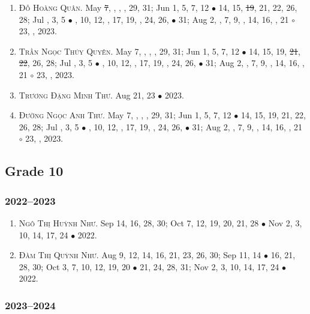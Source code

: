 \documentclass{article}
\begin{document}
\begin{enumerate}
	\item \textsc{Đỗ Hoàng Quân.} May \st{7}, , , , 29, 31; Jun 1, 5, 7, 12 $\bullet$ 14, 15, \st{19}, 21, 22, 26, 28; Jul , 3, 5 $\bullet$ , 10, 12, , 17, 19, , 24, 26,  $\bullet$ 31; Aug 2, , 7, 9, , 14, 16, , 21 $\circ$ 23, , 2023.
	\item \textsc{Trần Ngọc Thúy Quyên.} May 7, , , , 29, 31; Jun 1, 5, 7, 12 $\bullet$ 14, 15, 19, \st{21}, \st{22}, 26, 28; Jul , 3, 5 $\bullet$ , 10, 12, , 17, 19, , 24, 26,  $\bullet$ 31; Aug 2, , 7, 9, , 14, 16, , 21 $\circ$ 23, , 2023.
	\item \textsc{Trương Đặng Minh Thư.} Aug 21, 23 $\bullet$ 2023.
	\item \textsc{Đường Ngọc Anh Thư.} May 7, , , , 29, 31; Jun 1, 5, 7, 12 $\bullet$ 14, 15, 19, 21, 22, 26, 28; Jul , 3, 5 $\bullet$ , 10, 12, , 17, 19, , 24, 26,  $\bullet$ 31; Aug 2, , 7, 9, , 14, 16, , 21 $\circ$ 23, , 2023.
\end{enumerate}


\subsection{Grade 10}

\subsubsection{2022--2023}

\begin{enumerate}
	\item \textsc{Ngô Thị Huỳnh Như.} {\sf[In]} Sep 14, 16, 28, 30; Oct 7, 12, 19, 20, 21, 28 $\bullet$ Nov 2, 3, 10, 14, 17, 24 $\bullet$ 2022. {\sf[Out]}
	\item \textsc{Đàm Thị Quỳnh Như.} {\sf[In]} Aug 9, 12, 14, 16, 21, 23, 26, 30; Sep 11, 14 $\bullet$ 16, 21, 28, 30; Oct 3, 7, 10, 12, 19, 20 $\bullet$ 21, 24, 28, 31; Nov 2, 3, 10, 14, 17, 24 $\bullet$ 2022. {\sf[Out]}
\end{enumerate}

\subsubsection{2023--2024}
\end{document}
